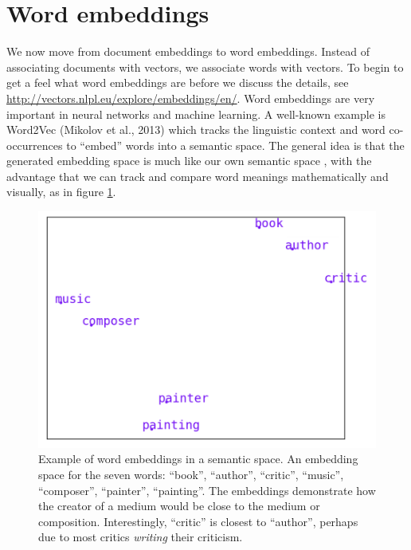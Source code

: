 \section{Word embeddings}

We now move from document embeddings to word embeddings.  Instead of associating documents with vectors, we associate words with vectors. To begin to get a feel what word embeddings are before we discuss the details, see \url{http://vectors.nlpl.eu/explore/embeddings/en/}. Word embeddings are very important in neural networks and machine learning. A well-known example is Word2Vec (Mikolov et al., 2013) which tracks the linguistic context and word co-occurrences to ``embed'' words into a semantic space. The general idea is that the generated embedding space is much like our own semantic space \cite{lewis2019distributional}, with the advantage that we can track and compare word meanings mathematically and visually, as in figure \ref{f:writerPainterExample}. 

\begin{figure}[h]
    \centering
    \includegraphics[scale=.5]{./images/Word_vector_demo.png}
    \caption[Generated using \url{http://vectors.nlpl.eu/explore/embeddings/en/}.]{Example of word embeddings in a semantic space. An embedding space for the seven words: ``book'', ``author'', ``critic'', ``music'', ``composer'', ``painter'', ``painting''. The embeddings demonstrate how the creator of a medium would be close to the medium or composition. Interestingly, ``critic'' is closest to ``author'', perhaps due to most critics \textit{writing} their criticism.}
 \label{f:writerPainterExample}
\end{figure}

